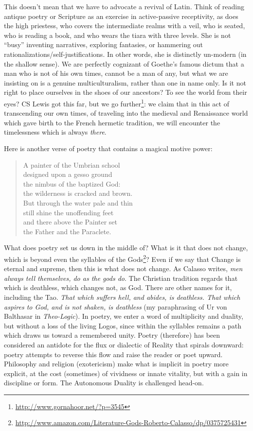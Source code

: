 This doesn't mean that we have to advocate a revival of Latin. Think of reading antique poetry or Scripture as an exercise in active-passive receptivity, as does the high priestess, who covers the intermediate realms with a veil, who is seated, who is reading a book, and who wears the tiara with three levels. She is not ``busy'' inventing narratives, exploring fantasies, or hammering out rationalizations/self-justifications. In other words, she is distinctly un-modern (in the shallow sense). We are perfectly cognizant of Goethe's famous dictum that a man who is not of his own times, cannot be a man of any, but what we are insisting on is a genuine multiculturalism, rather than one in name only. Is it not right to place ourselves in the shoes of our ancestors? To see the world from their eyes? CS Lewis got this far, but we go further\footnote{\url{http://www.gornahoor.net/?p=3545}}: we claim that in this act of transcending our own times, of traveling into the medieval and Renaissance world which gave birth to the French hermetic tradition, we will encounter the timelessness which is always \emph{there}.


Here is another verse of poetry that contains a magical motive power:

\begin{quotex}
\begin{verse}
A painter of the Umbrian school\\
designed upon a gesso ground\\
the nimbus of the baptized God:\\
the wilderness is cracked and brown.\\
But through the water pale and thin\\
still shine the unoffending feet\\
and there above the Painter set\\
the Father and the Paraclete.
\end{verse}
\end{quotex}


What does poetry set us down in the middle of? What is it that does not change, which is beyond even the syllables of the Gods\footnote{\url{http://www.amazon.com/Literature-Gods-Roberto-Calasso/dp/0375725431}}? Even if we say that Change is eternal and supreme, then this is what does not change. As Calasso writes, \emph{men always tell themselves, do as the gods do}. The Christian tradition regards that which is deathless, which changes not, as God. There are other names for it, including the Tao. \emph{That which suffers hell, and abides, is deathless. That which aspires to God, and is not shaken, is deathless} (my paraphrasing of Ur von Balthasar in \emph{Theo-Logic}). In poetry, we enter a word of multiplicity and duality, but without a loss of the living Logos, since within the syllables remains a path which draws us toward a remembered unity. Poetry (therefore) has been considered an antidote for the flux or dialectic of Reality that spirals downward: poetry attempts to reverse this flow and raise the reader or poet upward. Philosophy and religion (exotericism) make what is implicit in poetry more explicit, at the cost (sometimes) of vividness or innate vitality, but with a gain in discipline or form. The Autonomous Duality is challenged head-on.


